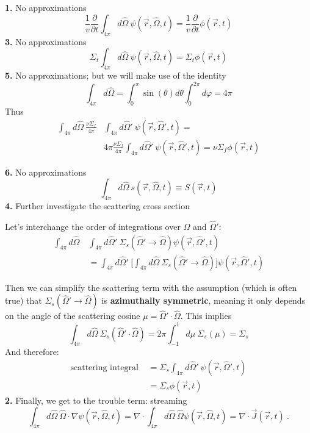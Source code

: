 \documentclass[12pt]{article}
\newcommand{\vOmega}{\ensuremath{\hat{\Omega}}}
\begin{document}
\textbf{1.} No approximations
\begin{equation}
\frac{1}{v}\frac{\partial}{\partial t} \int_{4\pi} d\vOmega \: \psi(\vec{r}, \vOmega, t) = \boxed{\frac{1}{v}\frac{\partial}{\partial t}\phi(\vec{r}, t)}\nonumber
\end{equation}
\textbf{3.} No approximations
\begin{equation}
\Sigma_t \int_{4\pi} d\vOmega \:\psi(\vec{r}, \vOmega, t) = \boxed{\Sigma_t \phi(\vec{r}, t)} \nonumber 
\end{equation}
\textbf{5.} No approximations; but we will make use of the identity
\[\int_{4\pi} d\vOmega = \int_0^{\pi} \sin(\theta) d\theta \int_0^{2\pi} d\varphi = 4\pi \]
Thus
\begin{align*}
\int_{4\pi} d\vOmega\: \frac{\nu \Sigma_f}{4\pi} &\int_{4\pi} d\vOmega' \:\psi(\vec{r},\vOmega', t) = \\
& 4\pi \frac{\nu \Sigma_f}{4\pi} \int_{4\pi} d\vOmega'\: \psi(\vec{r},\vOmega', t) = \boxed{\nu \Sigma_f \phi(\vec{r}, t)}
\end{align*}

\textbf{6.} No approximations
\begin{equation}
\int_{4\pi} d\vOmega \:s(\vec{r}, \vOmega, t) \equiv \boxed{S(\vec{r}, t)} \nonumber
\end{equation}
\textbf{4.} Further investigate the scattering cross section

Let's interchange the order of integrations over $\vOmega$ and $\vOmega'$:
%
\begin{align*}
\int_{4\pi} d\vOmega\: &\int_{4\pi} d\vOmega'\: \Sigma_s(\vOmega' \rightarrow \vOmega) \psi(\vec{r}, \vOmega', t)\\
%
&= \int_{4\pi} d\vOmega'\: \bigl[ \int_{4\pi} d\vOmega\: \Sigma_s(\vOmega' \rightarrow \vOmega)\bigr] \psi(\vec{r}, \vOmega', t)
\end{align*}

Then we can simplify the scattering term with the assumption (which is often true) that $\Sigma_s(\vOmega' \rightarrow \vOmega)$ is \textbf{azimuthally symmetric}, meaning it only depends on the angle of the scattering cosine $\mu =\vOmega' \cdot \vOmega$.  This implies
\[\int_{4\pi} d\vOmega \:\Sigma_s(\vOmega' \cdot \vOmega) = 2\pi \int_{-1}^{1} d\mu\: \Sigma_s(\mu) = \Sigma_s\]
%
And therefore:
%
\begin{align*}
\text{scattering integral }&= \Sigma_s \int_{4\pi} d\vOmega'\: \psi(\vec{r}, \vOmega', t) \\
%
&= \boxed{\Sigma_s \phi(\vec{r}, t)}
\end{align*}
\textbf{2.} Finally, we get to the trouble term: streaming
%
\[\int_{4\pi} d\vOmega \:\vOmega \cdot \nabla \psi(\vec{r}, \vOmega, t) = \nabla \cdot \int_{4\pi} d\vOmega \:\vOmega \psi(\vec{r}, \vOmega, t) = \nabla \cdot \vec{J}(\vec{r}, t)\:. \]
\end{document}
